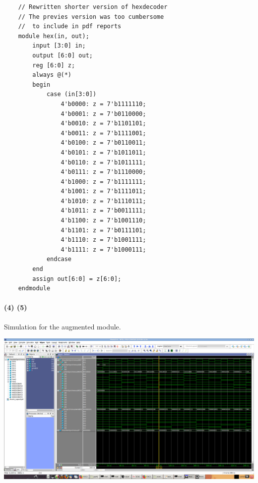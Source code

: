 \documentclass{article}
\begin{document}
\begin{verbatim}
    // Rewritten shorter version of hexdecoder
    // The previes version was too cumbersome
    // 	to include in pdf reports
    module hex(in, out);
    	input [3:0] in;
    	output [6:0] out;
    	reg [6:0] z;
    	always @(*)
    	begin
    		case (in[3:0])
    			4'b0000: z = 7'b1111110;
    			4'b0001: z = 7'b0110000;
    			4'b0010: z = 7'b1101101; 
    			4'b0011: z = 7'b1111001;
    			4'b0100: z = 7'b0110011;
    			4'b0101: z = 7'b1011011;  
    			4'b0110: z = 7'b1011111;
    			4'b0111: z = 7'b1110000;
    			4'b1000: z = 7'b1111111;
    			4'b1001: z = 7'b1111011;
    			4'b1010: z = 7'b1110111; 
    			4'b1011: z = 7'b0011111;
    			4'b1100: z = 7'b1001110;
    			4'b1101: z = 7'b0111101;
    			4'b1110: z = 7'b1001111;
    			4'b1111: z = 7'b1000111;
    		endcase
    	end
    	assign out[6:0] = z[6:0];
    endmodule 
\end{verbatim}

\paragraph{(4) (5)} Simulation for the augmented module.
\begin{center}
    \includegraphics[scale=0.25]{q1_model_sim.png}
\end{center}{}
\end{document}

